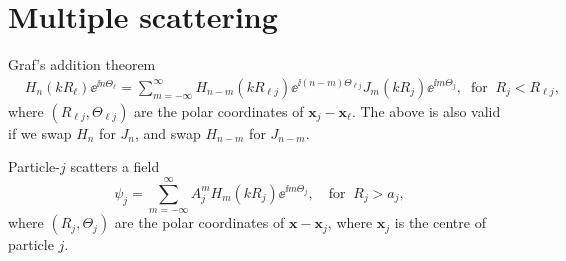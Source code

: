 \documentclass[ 12pt, a4paper]{article}
\renewcommand{\vec}[1]{\boldsymbol{#1}}
\begin{document}
%

\section{Multiple scattering}

Graf's addition theorem
\begin{align}
  & H_n(k R_\ell)\ee^{\ii n \Theta_\ell} =
  \sum_{m=-\infty}^\infty H_{n-m}(k R_{\ell j})\ee^{\ii(n-m)\Theta_{\ell j}} J_{m}(k R_j)\ee^{\ii m \Theta_j}, \;\;\text{for}\;\; R_j < R_{\ell j},
\label{eqn:Graf}
\end{align}
where $(R_{\ell j},\Theta_{\ell j})$ are the polar coordinates of $\vec x_j - \vec x_\ell$. The above is also valid if we swap $H_n$  for $J_n$, and swap $H_{n-m}$ for $J_{n-m}$.

Particle-$j$ scatters a field
\begin{equation}
  \label{eqn:outwaves}
  \psi_j = \sum_{m=-\infty}^\infty A_j^m H_{m}(k R_j) \ee^{\ii m \Theta_j}, \quad \text{for} \;\; R_j > a_j,
\end{equation}
where $(R_j,\Theta_j)$ are the polar coordinates of $\vec x - \vec x_j$, where $\vec x_j$ is the centre of particle $j$.
\end{document}
